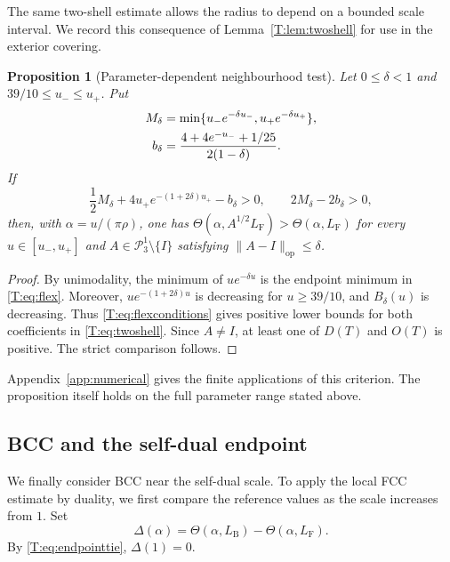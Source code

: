 \documentclass[reqno,english]{amsart}
\newtheorem{proposition}[theorem]{Proposition}
\theoremstyle{definition}
\newtheorem{open problem}[theorem]{Open Problem}
\theoremstyle{remark}
\theoremstyle{plain}
\numberwithin{equation}{section}
\newcommand{\FCC}{L_{\mathrm F}}
\newcommand{\B}{L_{\mathrm B}}
\newcommand{\BCC}{\B}
\newcommand{\PP}{\mathcal P_3^1}
\newcommand{\op}{\mathrm{op}}
\newcommand{\Th}{\Theta}
\newcommand{\Id}{I}
\begin{document}
The same two-shell estimate allows the radius to depend on a bounded
scale interval. We record this consequence of
Lemma~\ref{T:lem:twoshell} for use in the exterior covering.

\begin{proposition}[Parameter-dependent neighbourhood test]\label{T:prop:flexible}
Let $0\le\delta<1$ and $39/10\le u_-\le u_+$. Put
\begin{align}\label{T:eq:flex}
 M_\delta&=\min\{u_-e^{-\delta u_-},u_+e^{-\delta u_+}\},\notag\\
 b_\delta&=\frac{4+4e^{-u_-}+1/25}{2(1-\delta)}.
\end{align}
If
\begin{equation}\label{T:eq:flexconditions}
 \frac12M_\delta+4u_+e^{-(1+2\delta)u_+}-b_\delta>0,
 \qquad 2M_\delta-2b_\delta>0,
\end{equation}
then, with $\alpha=u/(\pi\rho)$, one has
$\Th(\alpha,A^{1/2}\FCC)>\Th(\alpha,\FCC)$ for every $u\in[u_-,u_+]$
and $A\in\PP\setminus\{\Id\}$ satisfying $\|A-\Id\|_{\op}\le\delta$.
\end{proposition}
\begin{proof}
By unimodality, the minimum of $u e^{-\delta u}$ is the endpoint
minimum in \eqref{T:eq:flex}. Moreover, $u e^{-(1+2\delta)u}$
is decreasing for $u\ge39/10$, and $B_\delta(u)$ is decreasing.
Thus \eqref{T:eq:flexconditions} gives positive lower bounds for
both coefficients in \eqref{T:eq:twoshell}. Since $A\ne\Id$, at
least one of $D(T)$ and $O(T)$ is positive. The strict comparison
follows.
\end{proof}

Appendix~\ref{app:numerical} gives the finite applications of this
criterion. The proposition itself holds on the full parameter range
stated above.

\subsection{BCC and the self-dual endpoint}\label{T:sec:bcc-endpoint}
We finally consider BCC near the self-dual scale. To apply the local
FCC estimate by duality, we first compare the reference values as the
scale increases from $1$. Set
\begin{equation}\label{T:eq:gap}
 \Delta(\alpha)=\Th(\alpha,\BCC)-\Th(\alpha,\FCC).
\end{equation}
By \eqref{T:eq:endpointtie}, $\Delta(1)=0$.
\end{document}
